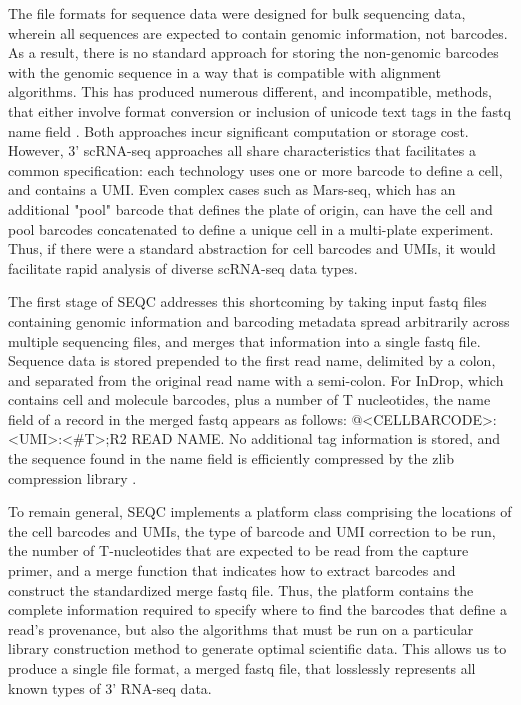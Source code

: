 The file formats for sequence data were designed for bulk sequencing data, wherein all sequences are expected to contain genomic information, not barcodes.
As a result, there is no standard approach for storing the non-genomic barcodes with the genomic sequence in a way that is compatible with alignment algorithms.
This has produced numerous different, and incompatible, methods, that either involve format conversion \citep{Macosko2015} or inclusion of unicode text tags in the fastq name field \citep{Jaitin2014}. 
Both approaches incur significant computation or storage cost.
However, 3' scRNA-seq approaches all share characteristics that facilitates a common specification: each technology uses one or more barcode to define a cell, and contains a UMI\@. 
Even complex cases such as Mars-seq, which has an additional "pool" barcode that defines the plate of origin, can have the cell and pool barcodes concatenated to define a unique cell in a multi-plate experiment.
Thus, if there were a standard abstraction for cell barcodes and UMIs, it would facilitate rapid analysis of diverse scRNA-seq data types.

The first stage of SEQC addresses this shortcoming by taking input fastq files containing genomic information and barcoding metadata spread arbitrarily across multiple sequencing files, and merges that information into a single fastq file. 
Sequence data is stored prepended to the first read name, delimited by a colon, and separated from the original read name with a semi-colon.
For InDrop, which contains cell and molecule barcodes, plus a number of T nucleotides, the name field of a record in the merged fastq appears as follows: {\mono @<CELLBARCODE>:<UMI>:<\#T>;R2 READ NAME}.
No additional tag information is stored, and the sequence found in the name field is efficiently compressed by the zlib compression library \citep{Gailly2004}.

To remain general, SEQC implements a platform class comprising the locations of the cell barcodes and UMIs, the type of barcode and UMI correction to be run, the number of T-nucleotides that are expected to be read from the capture primer, and a merge function that indicates how to extract barcodes and construct the standardized merge fastq file. 
Thus, the platform contains the complete information required to specify where to find the barcodes that define a read's provenance, but also the algorithms that must be run on a particular library construction method to generate optimal scientific data. This allows us to produce a single file format, a merged fastq file, that losslessly represents all known types of 3' RNA-seq data. 


